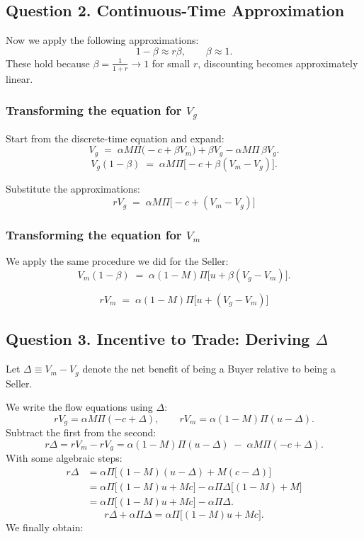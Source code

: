 \documentclass[11pt, a4paper]{article}
\begin{document}
\subsection*{Question 2. Continuous-Time Approximation}

Now we apply the following approximations:
\[
  1 - \beta \approx r\beta, \qquad \beta \approx 1.
\]
These hold because $\beta = \frac{1}{1+r} \to 1$ for small $r$, discounting becomes approximately linear.

\subsubsection*{Transforming the equation for $V_g$}

Start from the discrete-time equation and expand:
\[
  V_g \;=\; \alpha M\Pi\bigl(-c + \beta V_m\bigr)
           + \beta V_g - \alpha M\Pi\,\beta V_g.
\]
\[
  V_g(1-\beta) \;=\; \alpha M\Pi\bigl[-c + \beta(V_m - V_g)\bigr].
\]

Substitute the approximations:
\[
  rV_g \;=\; \alpha M\Pi\bigl[-c + (V_m - V_g)\bigr]
\]

\subsubsection*{Transforming the equation for $V_m$}

We apply the same procedure we did for the Seller:
\[
  V_m(1-\beta) \;=\; \alpha(1- M)\Pi\bigl[u + \beta(V_g - V_m)\bigr].
\]

\[
  rV_m \;=\; \alpha(1- M)\Pi\bigl[u + (V_g - V_m)\bigr]
\]


\subsection*{Question 3. Incentive to Trade: Deriving $\Delta$}

Let $\Delta \equiv V_m - V_g$ denote the net benefit
of being a Buyer relative to being a Seller.

We write the flow equations using $\Delta$:
\[
  rV_g = \alpha M\Pi(-c + \Delta),
  \qquad
  rV_m = \alpha(1- M)\Pi(u - \Delta).
\]
Subtract the first from the second:
\[
  r\Delta = r V_m - r V_g
           = \alpha(1- M)\Pi(u-\Delta) \;-\; \alpha M\Pi(-c+\Delta).
\]
With some algebraic steps:
\begin{align*}
  r\Delta
  &= \alpha\Pi\bigl[(1- M)(u-\Delta) +  M(c-\Delta)\bigr] \\[4pt]
  &= \alpha\Pi\bigl[(1- M)u +  M c\bigr] - \alpha\Pi\Delta\bigl[(1- M)+ M\bigr] \\[4pt]
  &= \alpha\Pi\bigl[(1- M)u +  M c\bigr] - \alpha\Pi\Delta.
\end{align*}
\[
  r\Delta + \alpha\Pi\Delta = \alpha\Pi\bigl[(1- M)u +  M c\bigr].
\]
We finally obtain:
\end{document}
